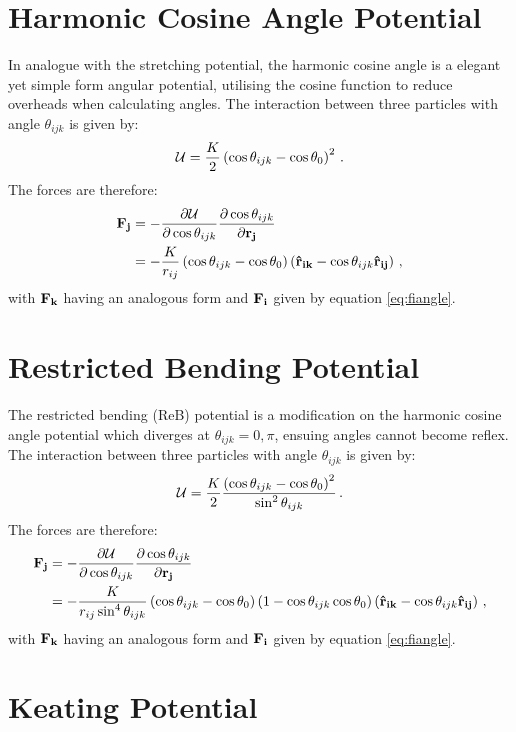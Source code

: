 \section{Harmonic Cosine Angle Potential}

In analogue with the stretching potential, the harmonic cosine angle is a elegant yet simple form angular potential, utilising the cosine function to reduce overheads when calculating angles.
The interaction between three particles with angle $\theta_{ijk}$ is given by:
\begin{equation}
	\mathcal{U} = \frac{K}{2}\left(\cos\theta_{ijk}-\cos\theta_0\right)^2\,.
\end{equation}
The forces are therefore:
\begin{align}
	\mathbf{F_j}&=-\frac{\partial \mathcal{U}}{\partial \cos\theta_{ijk}} \frac{\partial \cos\theta_{ijk}}{\partial \mathbf{r_j}} \nonumber \\ 
	&=-\frac{K}{r_{ij}}\left(\cos\theta_{ijk}-\cos\theta_0\right)\left(\boldsymbol{\hat{\mathbf{r}}_{\mathbf{ik}}}-\cos\theta_{ijk}\boldsymbol{\hat{\mathbf{r}}_{\mathbf{ij}}}\right) \,,
\end{align}
with $\mathbf{F_k}$ having an analogous form and $\mathbf{F_i}$ given by equation \eqref{eq:fiangle}.

\section{Restricted Bending Potential}

The restricted bending (ReB) potential is a modification on the harmonic cosine angle potential which diverges at $\theta_{ijk}=0,\pi$, ensuing angles cannot become reflex.
The interaction between three particles with angle $\theta_{ijk}$ is given by:
\begin{equation}
	\mathcal{U} = \frac{K}{2}\frac{\left(\cos\theta_{ijk}-\cos\theta_0\right)^2}{\sin^2\theta_{ijk}}\,.
\end{equation}
The forces are therefore:
\begin{align}
	\mathbf{F_j}&=-\frac{\partial \mathcal{U}}{\partial \cos\theta_{ijk}} \frac{\partial \cos\theta_{ijk}}{\partial \mathbf{r_j}} \nonumber \\ 
	&=-\frac{K}{r_{ij}\sin^4\theta_{ijk}}\left(\cos\theta_{ijk}-\cos\theta_0\right)\left(1-\cos\theta_{ijk}\cos\theta_0\right)\left(\boldsymbol{\hat{\mathbf{r}}_{\mathbf{ik}}}-\cos\theta_{ijk}\boldsymbol{\hat{\mathbf{r}}_{\mathbf{ij}}}\right) \,,
\end{align}
with $\mathbf{F_k}$ having an analogous form and $\mathbf{F_i}$ given by equation \eqref{eq:fiangle}.

\section{Keating Potential}

